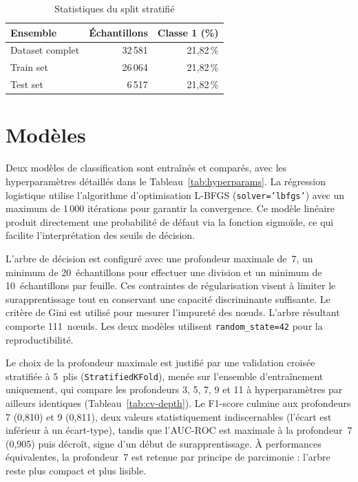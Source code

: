 \documentclass[12pt,a4paper,openany]{report}
\begin{document}
\begin{table}[H]
    \centering
    \caption{Statistiques du split stratifié}
    \label{tab:split}
    \begin{tabular}{lrr}
        \toprule
        \textbf{Ensemble} & \textbf{Échantillons} & \textbf{Classe 1 (\%)} \\
        \midrule
        Dataset complet & 32\,581 & 21,82\,\% \\
        Train set       & 26\,064 & 21,82\,\% \\
        Test set        &  6\,517 & 21,82\,\% \\
        \bottomrule
    \end{tabular}
\end{table}

\section{Modèles}

Deux modèles de classification sont entraînés et comparés, avec les hyperparamètres détaillés dans le Tableau~\ref{tab:hyperparams}. La régression logistique utilise l'algorithme d'optimisation L-BFGS (\texttt{solver='lbfgs'}) avec un maximum de 1\,000 itérations pour garantir la convergence. Ce modèle linéaire produit directement une probabilité de défaut via la fonction sigmoïde, ce qui facilite l'interprétation des seuils de décision.

L'arbre de décision est configuré avec une profondeur maximale de~7, un minimum de 20~échantillons pour effectuer une division et un minimum de 10~échantillons par feuille. Ces contraintes de régularisation visent à limiter le surapprentissage tout en conservant une capacité discriminante suffisante. Le critère de Gini est utilisé pour mesurer l'impureté des n\oe{}uds. L'arbre résultant comporte 111~n\oe{}uds. Les deux modèles utilisent \texttt{random\_state=42} pour la reproductibilité.

Le choix de la profondeur maximale est justifié par une validation croisée stratifiée à 5~plis (\texttt{StratifiedKFold}), menée sur l'ensemble d'entraînement uniquement, qui compare les profondeurs 3, 5, 7, 9 et 11 à hyperparamètres par ailleurs identiques (Tableau~\ref{tab:cv-depth}). Le F1-score culmine aux profondeurs 7 (0,810) et 9 (0,811), deux valeurs statistiquement indiscernables (l'écart est inférieur à un écart-type), tandis que l'AUC-ROC est maximale à la profondeur~7 (0,905) puis décroît, signe d'un début de surapprentissage. À performances équivalentes, la profondeur~7 est retenue par principe de parcimonie : l'arbre reste plus compact et plus lisible.
\end{document}
